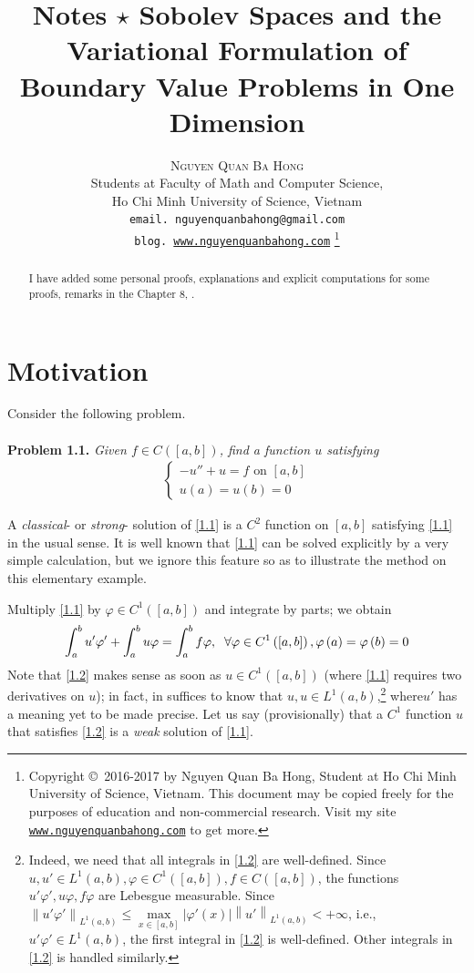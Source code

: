 \documentclass[a4paper,oneside]{article}
\title{\huge Notes $\star$ Sobolev Spaces and the Variational Formulation of Boundary Value Problems in One Dimension}
\author{\textsc{Nguyen Quan Ba Hong}\\
{\small Students at Faculty of Math and Computer Science,}\\ 
{\small Ho Chi Minh University of Science, Vietnam} \\
{\small \texttt{email. nguyenquanbahong@gmail.com}}\\
{\small \texttt{blog. \url{www.nguyenquanbahong.com}} 
\footnote{Copyright \copyright\ 2016-2017 by Nguyen Quan Ba Hong, Student at Ho Chi Minh University of Science, Vietnam. This document may be copied freely for the purposes of education and non-commercial research. Visit my site \texttt{\url{www.nguyenquanbahong.com}} to get more.}}}
\numberwithin{equation}{section}
\begin{document}
\maketitle
\begin{abstract}
I have added some personal proofs, explanations and explicit computations for some proofs, remarks in the Chapter 8, \cite{1}.
\end{abstract}
\newpage
\tableofcontents
\newpage
\section{Motivation}
Consider the following problem.\\
\\
\textbf{Problem 1.1.} \textit{Given $f\in C\left(\left[a,b\right]\right)$, find a function $u$ satisfying}
\begin{align}
\label{1.1}
\left\{ \begin{array}{l}
 - u'' + u = f\mbox{ on } \left[ {a,b} \right]\\
u\left( a \right) = u\left( b \right) = 0
\end{array} \right.
\end{align}

A \textit{classical}- or \textit{strong}- solution of \eqref{1.1} is a $C^2$ function on $\left[a,b\right]$ satisfying \eqref{1.1} in the usual sense. It is well known that \eqref{1.1} can be solved explicitly by a very simple calculation, but we ignore this feature so as to illustrate the method on this elementary example.

Multiply \eqref{1.1} by $\varphi  \in {C^1}\left( {\left[ {a,b} \right]} \right)$ and integrate by parts; we obtain
\begin{align}
\label{1.2}
\int_a^b {u'\varphi '}  + \int_a^b {u\varphi }  = \int_a^b {f\varphi } ,\hspace{0.2cm}\forall \varphi  \in {C^1}\left( {\left[ {a,b} \right]} \right),\varphi \left( a \right) = \varphi \left( b \right) = 0
\end{align}
Note that \eqref{1.2} makes sense as soon as $u \in {C^1}\left( {\left[ {a,b} \right]} \right)$ (where \eqref{1.1} requires two derivatives on $u$); in fact, in suffices to know that $u,u\in L^1\left(a,b\right)$,\footnote{Indeed, we need that all integrals in \eqref{1.2} are well-defined. Since $u,u' \in {L^1}\left( {a,b} \right),\varphi  \in {C^1}\left( {\left[ {a,b} \right]} \right),f \in C\left( {\left[ {a,b} \right]} \right)$, the functions $u'\varphi',u\varphi,f\varphi$ are Lebesgue measurable. Since ${\left\| {u'\varphi '} \right\|_{{L^1}\left( {a,b} \right)}} \le \mathop {\max }\limits_{x \in \left[ {a,b} \right]} \left| {\varphi '\left( x \right)} \right|{\left\| {u'} \right\|_{{L^1}\left( {a,b} \right)}} <  + \infty $, i.e., $u'\varphi ' \in {L^1}\left( {a,b} \right)$, the first integral in \eqref{1.2} is well-defined. Other integrals in \eqref{1.2} is handled similarly.} where$u'$ has a meaning yet to be made precise. Let us say (provisionally) that a $C^1$ function $u$ that satisfies \eqref{1.2} is a \textit{weak} solution of \eqref{1.1}.
\end{document}
